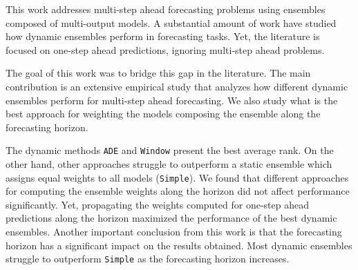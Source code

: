 \documentclass[smallcondensed]{svjour3}
\begin{document}
This work addresses multi-step ahead forecasting problems using ensembles composed of multi-output models. A substantial amount of work have studied how dynamic ensembles perform in forecasting tasks. Yet, the literature is focused on one-step ahead predictions, ignoring multi-step ahead problems.

The goal of this work was to bridge this gap in the literature. The main contribution is an extensive empirical study that analyzes how different dynamic ensembles perform for multi-step ahead forecasting. We also study what is the best approach for weighting the models composing the ensemble along the forecasting horizon.

The dynamic methods \texttt{ADE} and \texttt{Window} present the best average rank. On the other hand, other approaches struggle to outperform a static ensemble which assigns equal weights to all models (\texttt{Simple}).
We found that different approaches for computing the ensemble weights along the horizon did not affect performance significantly. Yet, propagating the weights computed for one-step ahead predictions along the horizon maximized the performance of the best dynamic ensembles.
Another important conclusion from this work is that the forecasting horizon has a significant impact on the results obtained. Most dynamic ensembles struggle to outperform \texttt{Simple} as the forecasting horizon increases.

 
\end{document}
